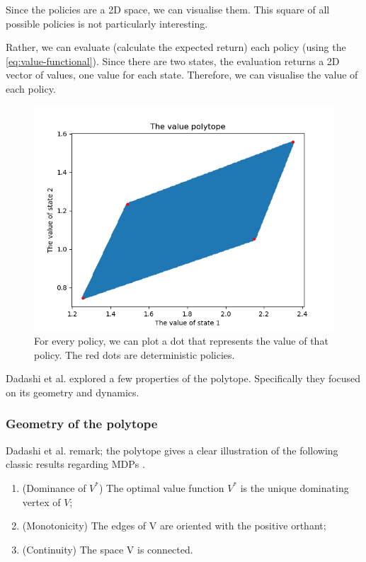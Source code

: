 Since the policies are a 2D space, we can visualise them. This square of all possible policies is not particularly interesting.

Rather, we can evaluate (calculate the expected return) each policy (using the \eqref{eq:value-functional}).
Since there are two states, the evaluation returns a 2D vector of values, one value for each state.
Therefore, we can visualise the value of each policy.
\begin{figure}[!hb]
\centering
\includegraphics[width=1\textwidth,height=0.5\textheight]{../../pictures/figures/value-polytope.png}
\caption{For every policy, we can plot a dot that represents the value of that policy.
The red dots are deterministic policies.}
\end{figure}

Dadashi et al. \cite{Dadashi2018} explored a few properties of the polytope.
Specifically they focused on its geometry and dynamics.

\subsubsection{Geometry of the polytope}

Dadashi et al. remark; the polytope gives a clear illustration of the following classic results regarding MDPs \cite{Bertsekas1996}.

\begin{enumerate}
\tightlist
  \item (Dominance of $V^*$) The optimal value function $V^*$ is the unique dominating vertex of $V$;
  \item (Monotonicity) The edges of V are oriented with the positive orthant;
  \item (Continuity) The space V is connected.
\end{enumerate}

